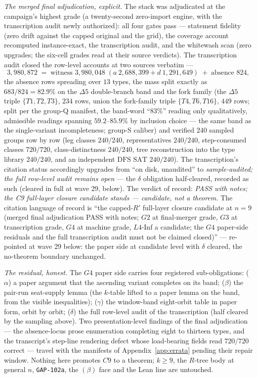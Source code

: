 \emph{The merged final adjudication, explicit.} The stack was adjudicated at
the campaign's highest grade (a twenty-second zero-import engine, with the
transcription audit newly authorized): all four gates pass --- statement
fidelity (zero drift against the capped original and the grid), the coverage
account recomputed instance-exact, the transcription audit, and the
whitewash scan (zero upgrades; the six-cell grades read at their source
verdicts). The transcription audit closed the row-level accounts at two
sources verbatim ---
\[
3{,}980{,}872 \;=\; \text{witness } 3{,}980{,}048
\;(a\ 2{,}688{,}399+d\ 1{,}291{,}649)\;+\;\text{absence } 824,
\]
the absence rows spreading over $13$ types, the mass split exactly as
$683/824=82.9\%$ on the $\Delta5$ double-branch band and the fork family
(the $\Delta5$ triple $\{T1,T2,T3\}$, $234$ rows, union the fork-family
triple $\{T4,T6,T16\}$, $449$ rows; split per the group-Q manifest, the
band-word ``$83\%$'' reading only qualitatively, admissible readings
spanning $59.2$--$85.9\%$ by inclusion choice --- the same band as the
single-variant incompleteness; group-S caliber) and verified $240$ sampled
groups row by
row (leg classes $240/240$, representatives $240/240$, step-consumed classes
$720/720$, class-distinctness $240/240$, tree reconstruction into the type
library $240/240$, and an independent $\mathrm{DFS}$ $\mathrm{SAT}$
$240/240$). The transcription's citation status accordingly upgrades from
``on disk, unaudited'' to \emph{sample-audited; the full row-level audit
remains open} --- the $\delta$ obligation half-cleared, recorded as such
(cleared in full at wave 29, below).
The verdict of record: \emph{PASS with notes; the C9 full-layer closure
candidate stands --- candidate, not a theorem.} The citation language of
record is ``the capped-$R'$ full-layer closure candidate at $n=9$ (merged
final adjudication PASS with notes; $G2$ at final-merger grade, $G3$ at
transcription grade, $G4$ at machine grade, $L4$-Inf a candidate; the $G4$
paper-side residuals and the full transcription audit must not be claimed
closed)'' --- re-pointed at wave 29 below: the paper side at candidate
level with $\delta$ cleared, the no-theorem boundary unchanged.

\emph{The residual, honest.} The $G4$ paper side carries four registered
sub-obligations: \textup{($\alpha$)} a paper argument that the ascending
variant completes on its band; \textup{($\beta$)} the pair-run seat-supply
lemma (the $k$-table lifted to a paper lemma on the band, from the visible
inequalities); \textup{($\gamma$)} the window-band eight-orbit table in
paper form, orbit by orbit; \textup{($\delta$)} the full row-level audit of
the transcription (half cleared by the sampling above). Two presentation-level
findings of the final adjudication --- the absence-locus prose enumeration
completing eight to thirteen types, and the transcript's step-line rendering
defect whose load-bearing fields read $720/720$ correct --- travel with the
manifests of Appendix~\ref{app:errata} pending their repair window. Nothing
here promotes $C9$ to a theorem; $k\ge9$, the $R$-tree body at general $n$,
\texttt{GAP-102a}, the $(\beta)$ face and the Lean line are untouched.

